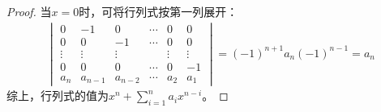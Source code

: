 \begin{proof}
    当\(x=0\)时，可将行列式按第一列展开：
    \begin{align*}
        \begin{vmatrix}
            0      & -1      & 0       & \cdots & 0      & 0      \\
            0      & 0       & -1      & \cdots & 0      & 0      \\
            \vdots & \vdots  & \vdots  &        & \vdots & \vdots \\
            0      & 0       & 0       & \cdots & 0      & -1     \\
            a_n    & a_{n-1} & a_{n-2} & \cdots & a_2    & a_1
        \end{vmatrix}=(-1)^{n+1}a_n(-1)^{n-1}=a_n
    \end{align*}
    综上，行列式的值为\(x^n+\sum_{i=1}^{n}a_ix^{n-i}\)。
\end{proof}

